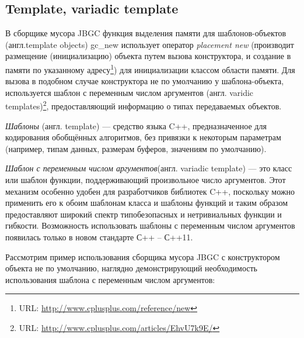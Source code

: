 \subsection{Template, variadic template} 

В сборщике мусора JBGC функция выделения памяти для шаблонов-объектов (англ.template objects) gc\_new  использует оператор \textit{placement new} (производит размещение (инициализацию) объекта путем вызова конструктора, и создание в памяти по указанному адресу\footnote{URL: \url{http://www.cplusplus.com/reference/new}}) для инициализации классом области памяти. Для вызова в подобном случае конструктора не по умолчанию у шаблона-объекта,  используется шаблон с переменным числом аргументов (англ. varidic templates)\footnote{URL: \url{http://www.cplusplus.com/articles/EhvU7k9E/}}, предоставляющий информацию о типах передаваемых объектов.

\textit{Шаблоны} (англ. template) — средство языка C++, предназначенное для кодирования обобщённых алгоритмов, без привязки к некоторым параметрам (например, типам данных, размерам буферов, значениям по умолчанию). 

\textit{Шаблон с переменным числом аргументов}(англ. variadic template) — это класс или шаблон функции, поддерживающий произвольное число аргументов. Этот механизм особенно удобен для разработчиков библиотек C++, поскольку можно применить его к обоим шаблонам класса и шаблоны функций и таким образом предоставляют широкий спектр типобезопасных и нетривиальных функции и гибкости. Возможность использовать шаблоны с переменным числом аргументов появилась только в новом стандарте С++ -- С++11. 

Рассмотрим пример использования сборщика мусора JBGC  с конструктором объекта не по умолчанию,  наглядно демонстрирующий необходимость использования шаблона с переменным числом аргументов:

